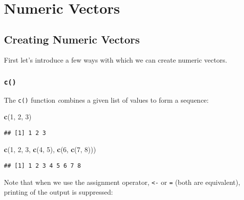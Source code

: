 \documentclass[10pt,b5paper,krantz1]{krantz}
\newenvironment{Shaded}{\begin{snugshade}}{\end{snugshade}}
\newcommand{\DecValTok}[1]{\textcolor[rgb]{0.06,0.06,0.06}{#1}}
\newcommand{\KeywordTok}[1]{\textcolor[rgb]{0.27,0.27,0.27}{\textbf{#1}}}
\newcommand{\NormalTok}[1]{#1}
\begin{document}
\hypertarget{numeric-vectors}{%
\section{Numeric Vectors}\label{numeric-vectors}}

\hypertarget{creating-numeric-vectors}{%
\subsection{Creating Numeric Vectors}\label{creating-numeric-vectors}}

First let's introduce a few ways with which we can create numeric vectors.

\hypertarget{c}{%
\subsubsection{\texorpdfstring{\texttt{c()}}{c()}}\label{c}}

The \texttt{c()} function \emph{c}ombines a given list of values to form a sequence:

\begin{Shaded}
\begin{Highlighting}[]
\KeywordTok{c}\NormalTok{(}\DecValTok{1}\NormalTok{, }\DecValTok{2}\NormalTok{, }\DecValTok{3}\NormalTok{)}
\end{Highlighting}
\end{Shaded}

\begin{verbatim}
## [1] 1 2 3
\end{verbatim}

\begin{Shaded}
\begin{Highlighting}[]
\KeywordTok{c}\NormalTok{(}\DecValTok{1}\NormalTok{, }\DecValTok{2}\NormalTok{, }\DecValTok{3}\NormalTok{, }\KeywordTok{c}\NormalTok{(}\DecValTok{4}\NormalTok{, }\DecValTok{5}\NormalTok{), }\KeywordTok{c}\NormalTok{(}\DecValTok{6}\NormalTok{, }\KeywordTok{c}\NormalTok{(}\DecValTok{7}\NormalTok{, }\DecValTok{8}\NormalTok{)))}
\end{Highlighting}
\end{Shaded}

\begin{verbatim}
## [1] 1 2 3 4 5 6 7 8
\end{verbatim}

Note that when we use the assignment operator, \texttt{\textless{}-} or \texttt{=} (both are
equivalent), printing of the output is suppressed:
\end{document}
